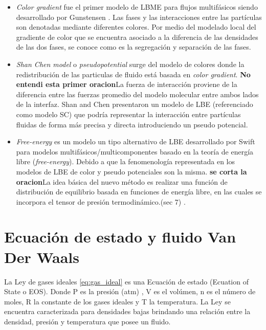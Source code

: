 \begin{itemize}
	
	\item \textit{Color gradient} fue el primer modelo de LBME para flujos multifásicos siendo desarrollado por Gunstensen \cite{gunstensen1991lattice}. Las fases y las interacciones entre las partículas son denotadas mediante diferentes colores. Por medio del modelado local del gradiente de color que se encuentra asociado a la diferencia de las densidades de las dos fases, se conoce como es la segregación y separación de las fases.
	
	\item \textit{Shan Chen model} o \textit{pseudopotential} surge del modelo de colores donde la redistribución de las particulas de fluido está basada en \textit{color gradient}. \textbf{No entendi esta primer oracion}La fuerza de interacción proviene de la diferencia entre las fuerzas promedio del modelo molecular  entre ambos lados de la interfaz. Shan and Chen \cite{shan1993lattice} presentaron un modelo de LBE (referenciado como modelo SC) que podría representar la interacción entre partículas fluidas de forma más precisa y directa introduciendo un pseudo potencial. 
	
	\item \textit{Free-energy} es un modelo un tipo alternativo de LBE desarrollado por Swift \cite{swift1995lattice} para modelos multifásicos/multicomponentes basado en la teoría de energía libre (\textit{free-energy}). Debido a que la fenomenología representada en los modelos de LBE de color y pseudo potenciales son la misma. \textbf{se corta la oracion}La idea básica del nuevo método es realizar una función de distribución de equilibrio basada en funciones de energía libre, en las cuales se incorpora el tensor de presión termodinámico.\cite{guo2013lattice}(sec 7) .
	
\end{itemize}

\section{Ecuación de estado y fluido Van Der Waals}

La Ley de gases ideales \ref{eq:gas_ideal} es una Ecuación de estado (Ecuation of State o EOS). Donde P es la presión (atm) , V es el volúmen, n es el número de moles, R la constante de los gases ideales y T la temperatura. La Ley se encuentra caracterizada para densidades bajas brindando una relación entre la densidad, presión y temperatura que posee un fluido.

